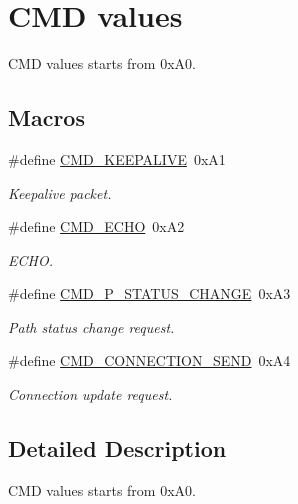 \hypertarget{group___c_m_d_values}{\section{C\-M\-D values}
\label{group___c_m_d_values}
}


C\-M\-D values starts from 0x\-A0.  


\subsection*{Macros}
\begin{DoxyCompactItemize}
\item 
\hypertarget{group___c_m_d_values_gaae6fd10fec2345b5792331f9975357f9}{\#define \hyperlink{group___c_m_d_values_gaae6fd10fec2345b5792331f9975357f9}{C\-M\-D\-\_\-\-K\-E\-E\-P\-A\-L\-I\-V\-E}~0x\-A1}\label{group___c_m_d_values_gaae6fd10fec2345b5792331f9975357f9}

\begin{DoxyCompactList}\small\item\em Keepalive packet. \end{DoxyCompactList}\item 
\hypertarget{group___c_m_d_values_gaab2defcae52a43223ec9391230fad10a}{\#define \hyperlink{group___c_m_d_values_gaab2defcae52a43223ec9391230fad10a}{C\-M\-D\-\_\-\-E\-C\-H\-O}~0x\-A2}\label{group___c_m_d_values_gaab2defcae52a43223ec9391230fad10a}

\begin{DoxyCompactList}\small\item\em E\-C\-H\-O. \end{DoxyCompactList}\item 
\hypertarget{group___c_m_d_values_ga11a3f40a3057a43b43832604f97b6bd6}{\#define \hyperlink{group___c_m_d_values_ga11a3f40a3057a43b43832604f97b6bd6}{C\-M\-D\-\_\-\-P\-\_\-\-S\-T\-A\-T\-U\-S\-\_\-\-C\-H\-A\-N\-G\-E}~0x\-A3}\label{group___c_m_d_values_ga11a3f40a3057a43b43832604f97b6bd6}

\begin{DoxyCompactList}\small\item\em Path status change request. \end{DoxyCompactList}\item 
\hypertarget{group___c_m_d_values_ga3cbfb52f44420bcf27ce2505bf44819a}{\#define \hyperlink{group___c_m_d_values_ga3cbfb52f44420bcf27ce2505bf44819a}{C\-M\-D\-\_\-\-C\-O\-N\-N\-E\-C\-T\-I\-O\-N\-\_\-\-S\-E\-N\-D}~0x\-A4}\label{group___c_m_d_values_ga3cbfb52f44420bcf27ce2505bf44819a}

\begin{DoxyCompactList}\small\item\em Connection update request. \end{DoxyCompactList}\end{DoxyCompactItemize}


\subsection{Detailed Description}
C\-M\-D values starts from 0x\-A0. 